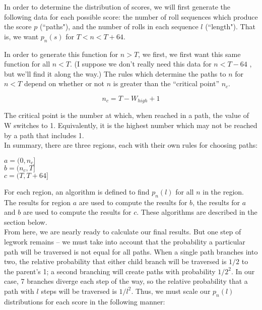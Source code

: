 \documentclass[a4paper, 11pt]{article}
\begin{document}
\medskip

In order to determine the distribution of scores, we will first generate the following data for each possible score: the number of roll sequences which produce the score $p$ (``paths"), and the number of rolls in each sequence $l$ (``length"). That is, we want $p_n(s)$ for $T < n < T + 64$. 

\medskip

In order to generate this function for $n > T$, we first, we first want this same function for all $n < T$. (I suppose we don't really need this data for $n < T - 64$ , but we'll find it along the way.) The rules which determine the paths to $n$ for $n < T$ depend on whether or not $n$ is greater than the ``critical point'' $n_c$.

\[ n_c = T - W_{high} + 1 \]

\pagebreak

The critical point is the number at which, when reached in a path, the value of W switches to 1. Equivalently, it is the highest number which may not be reached by a path that includes 1.\\

In summary, there are three regions, each with their own rules for choosing paths:

\medskip

\begin{adjustwidth}{3.0em}{3.0em}

	$a = (0, n_c]$ \\

	$b = (n_c, T]$ \\

	$c = (T, T + 64]$ \\

\end{adjustwidth}
\medskip

For each region, an algorithm is defined to find $p_n(l)$ for all $n$ in the region. The results for region $a$ are used to compute the results for $b$, the results for $a$ and $b$ are used to compute the results for $c$. These algorithms are described in the section below.\\

From here, we are nearly ready to calculate our final results. But one step of legwork remains -- we must take into account that the probability a particular path will be traversed is not equal for all paths. When a single path branches into two, the relative probability that either child branch will be traversed is $1/2$ to the parent's 1; a second branching will create paths with probability $1/2^2$. In our case, 7 branches diverge each step of the way, so the relative probability that a path with $l$ steps will be traversed is $1/l^2$. Thus, we must scale our $p_n(l)$ distributions for each score in the following manner:
\end{document}
